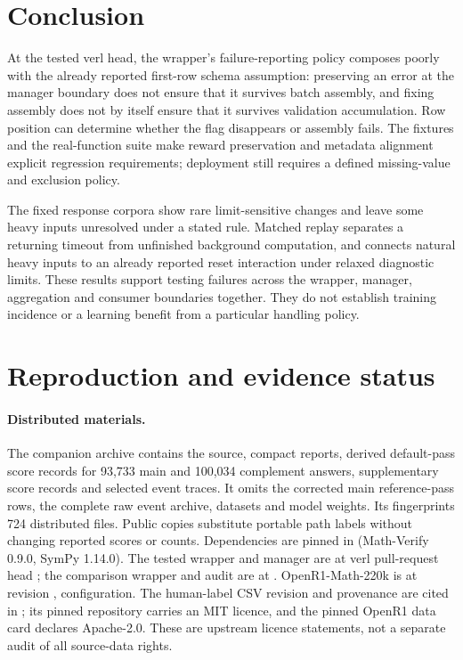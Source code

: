 \documentclass[11pt,a4paper]{article}
\begin{document}
\section{Conclusion}
At the tested verl head, the wrapper's failure-reporting policy composes poorly with the already reported first-row schema assumption: preserving an error at the manager boundary does not ensure that it survives batch assembly, and fixing assembly does not by itself ensure that it survives validation accumulation. Row position can determine whether the flag disappears or assembly fails. The fixtures and the real-function suite make reward preservation and metadata alignment explicit regression requirements; deployment still requires a defined missing-value and exclusion policy.

The fixed response corpora show rare limit-sensitive changes and leave some heavy inputs unresolved under a stated rule. Matched replay separates a returning timeout from unfinished background computation, and connects natural heavy inputs to an already reported reset interaction under relaxed diagnostic limits. These results support testing failures across the wrapper, manager, aggregation and consumer boundaries together. They do not establish training incidence or a learning benefit from a particular handling policy.

\appendix
\section{Reproduction and evidence status}
\paragraph{Distributed materials.} The companion archive  contains the source, compact reports, derived default-pass score records for 93,733 main and 100,034 complement answers, supplementary score records and selected event traces. It omits the corrected main reference-pass rows, the complete raw event archive, datasets and model weights. Its  fingerprints 724 distributed files. Public copies substitute portable path labels without changing reported scores or counts. Dependencies are pinned in  (Math-Verify 0.9.0, SymPy 1.14.0). The tested wrapper and manager are at verl pull-request head ; the comparison wrapper and  audit are at . OpenR1-Math-220k is at revision ,  configuration. The human-label CSV revision and provenance are cited in \cite{xinlabels}; its pinned repository carries an MIT licence, and the pinned OpenR1 data card declares Apache-2.0. These are upstream licence statements, not a separate audit of all source-data rights.
\end{document}
